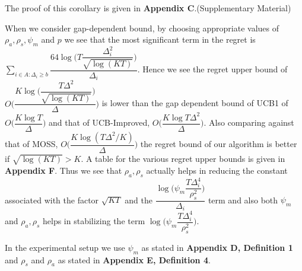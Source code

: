 	The proof of this corollary is given in \textbf{Appendix C}.(Supplementary Material)

\begin{remark}
\label{Result:Rem:4}
	When we consider gap-dependent bound, by choosing appropriate values of $\rho_{a},\rho_{s},\psi_{m}$ and $p$ we see that the most significant term in the regret is $\sum_{i\in A:\Delta_{i}\geq b}\dfrac{64\log{\big(T\dfrac{\Delta_{i}^{2}}{\sqrt{\log (KT)}}\big)}}{\Delta_{i}}$. Hence we see the regret upper bound of $O\bigg(\dfrac{K\log \big(\dfrac{T\Delta^{2}}{\sqrt{\log (KT)}}\big)}{\Delta}\bigg)$ is lower than the gap dependent bound of UCB1 of $O\bigg(\dfrac{K\log T}{\Delta}\bigg)$ and that of UCB-Improved, $O\bigg(\dfrac{K\log T\Delta^{2}}{\Delta}\bigg)$. Also comparing against that of MOSS, $O\bigg(\dfrac{K\log(T\Delta^{2}/K)}{\Delta}\bigg)$ the regret bound of our algorithm is better if $\sqrt{\log(KT)}>K$. A table for the various regret upper bounds is given in \textbf{Appendix F}. Thus we see that $\rho_{a},\rho_{s}$ actually helps in reducing the constant associated with the factor $\sqrt{KT}$ and the $\dfrac{\log\bigg(\psi_{m}\dfrac{T\Delta_{i}^{4}}{\rho_{s}^{2}}\bigg)}{\Delta_{i}}$ term and also both $\psi_{m}$ and $\rho_{a},\rho_{s}$ helps in stabilizing the term $\log\bigg(\psi_{m}\dfrac{T\Delta_{i}^{4}}{\rho_{s}^{2}}\bigg)$.
\end{remark}	



\begin{remark}
\label{Result:Rem:5}
In the experimental setup we use $\psi_{m}$ as stated in \textbf{Appendix D, Definition 1} and $\rho_{s}$ and $\rho_{a}$ as stated in \textbf{Appendix E, Definition 4}.
\end{remark}

